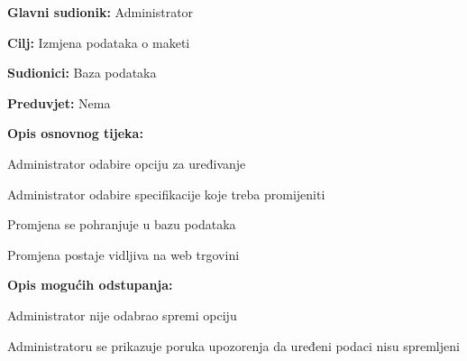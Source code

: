 					\noindent {}
					\begin{packed_item}
						
						\item \textbf{Glavni sudionik: } Administrator
						\item  \textbf{Cilj:} Izmjena podataka o maketi
						\item  \textbf{Sudionici:} Baza podataka
						\item  \textbf{Preduvjet:} Nema
						\item  \textbf{Opis osnovnog tijeka:}
						
						\item[] \begin{packed_enum}
							
							\item Administrator odabire opciju za uređivanje
							\item Administrator odabire specifikacije koje treba promijeniti
							\item Promjena se pohranjuje u bazu podataka
							\item Promjena postaje vidljiva na web trgovini
						\end{packed_enum}
						\item  \textbf{Opis mogućih odstupanja:}
						
						\item[] \begin{packed_item}
							
							\item[2.a] Administrator nije odabrao spremi opciju
							
							\item[] \begin{packed_enum}
								
								\item Administratoru se prikazuje poruka upozorenja da uređeni podaci nisu spremljeni
								
							\end{packed_enum}
							
						\end{packed_item}
					\end{packed_item}
				
